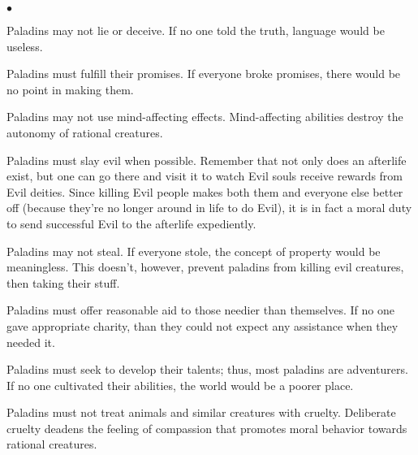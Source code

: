 {\begin{list}{$\bullet$}{\itemspace}
    \item Paladins may not lie or deceive. If no one told the truth, language would be useless.
    \item Paladins must fulfill their promises. If everyone broke promises, there would be no point in making them.
    \item Paladins may not use mind-affecting effects. Mind-affecting abilities destroy the autonomy of rational creatures.
    \item Paladins must slay evil when possible. Remember that not only does an afterlife exist, but one can go there and visit it to watch Evil souls receive rewards from Evil deities. Since killing Evil people makes both them and everyone else better off (because they're no longer around in life to do Evil), it is in fact a moral duty to send successful Evil to the afterlife expediently.
    \item Paladins may not steal. If everyone stole, the concept of property would be meaningless. This doesn't, however, prevent paladins from killing evil creatures, then taking their stuff.
    \item Paladins must offer reasonable aid to those needier than themselves. If no one gave appropriate charity, than they could not expect any assistance when they needed it.
    \item Paladins must seek to develop their talents; thus, most paladins are adventurers. If no one cultivated their abilities, the world would be a poorer place.
    \item Paladins must not treat animals and similar creatures with cruelty. Deliberate cruelty deadens the feeling of compassion that promotes moral behavior towards rational creatures.
\end{list} \vspace*{8pt}
}



